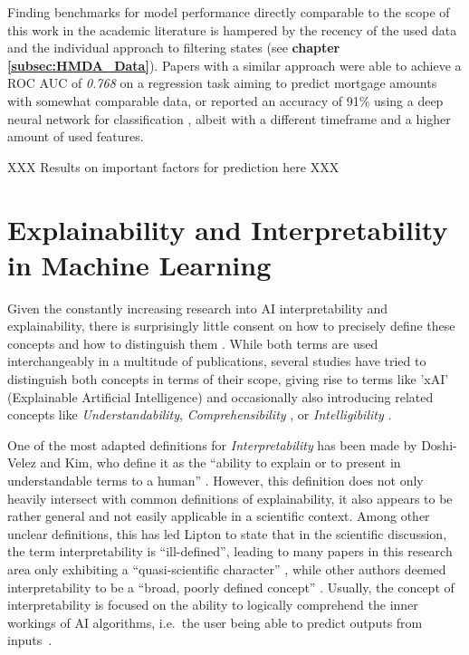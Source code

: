 Finding benchmarks for model performance directly comparable to the scope of this work in the academic literature is hampered by the recency of the used data and the individual approach to filtering states (see \textbf{chapter \ref{subsec:HMDA_Data}}).
Papers with a similar approach were able to achieve a ROC AUC of \textit{0.768} on a regression task aiming to predict mortgage amounts \parencite{Ghoba} with somewhat comparable data, 
or reported an accuracy of 91\% using a deep neural network for classification \parencite{Hodges2024}, albeit with a different timeframe and a higher amount of used features. 

XXX Results on important factors for prediction here XXX

\section{Explainability and Interpretability in Machine Learning}\label{sec:Explainability}

Given the constantly increasing research into AI interpretability and explainability, there is surprisingly little consent on how to precisely define these concepts and how to distinguish them \parencite{Linardatos2021}. 
While both terms are used interchangeably in a multitude of publications, several studies have tried to distinguish both concepts in terms of their scope, giving rise to terms like 'xAI' (Explainable Artificial Intelligence) \parencite{Gunning2019} and occasionally also introducing related concepts like \textit{Understandability}, \textit{Comprehensibility} \parencite{Guidotti2018}, or \textit{Intelligibility} \parencite{Caruana2015}.

One of the most adapted definitions for \textit{Interpretability} has been made by Doshi-Velez and Kim, who define it as the “ability to explain or to present in understandable terms to a human” \parencite{DoshiVelez2017}. 
However, this definition does not only heavily intersect with common definitions of explainability, it also appears to be rather general and not easily applicable in a scientific context. 
Among other unclear definitions, this has led Lipton to state that in the scientific discussion, the term interpretability is “ill-defined”, leading to many papers in this research area only exhibiting a “quasi-scientific character” \parencite{Lipton2018}, while other authors deemed interpretability to be a “broad, poorly defined concept” \parencite{Murdoch2019}. 
Usually, the concept of interpretability is focused on the ability to logically comprehend the inner workings of AI algorithms, i.e.\ the user being able to predict outputs from inputs~\parencite{Kim2016}.

